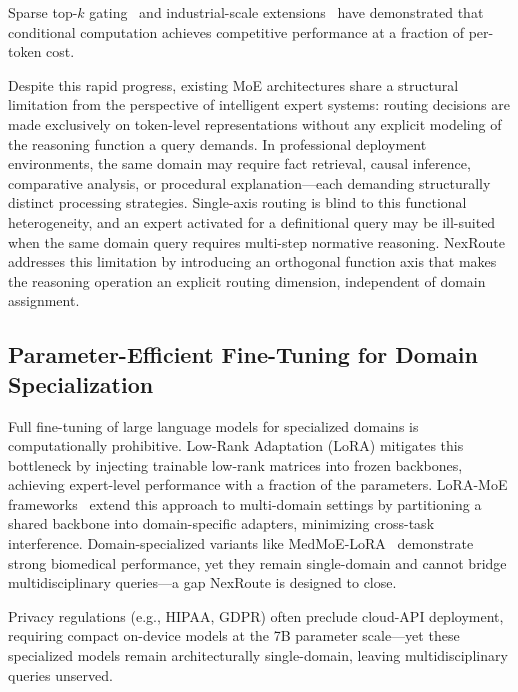 \documentclass[a4paper,fleql]{cas-sc}
\begin{document}
Sparse top-$k$ gating~\citep{fedus2022switch,jiang2024mixtral} and
industrial-scale extensions~\citep{deepseekai2025deepseekv3} have demonstrated
that conditional computation achieves competitive performance at a fraction of
per-token cost.

Despite this rapid progress, existing MoE architectures share a structural
limitation from the perspective of intelligent expert systems: routing decisions
are made exclusively on token-level representations without any explicit
modeling of the reasoning function a query demands. In professional deployment
environments, the same domain may require fact retrieval, causal inference,
comparative analysis, or procedural explanation---each demanding structurally
distinct processing strategies. Single-axis routing is blind to this
functional heterogeneity, and an expert activated for a definitional query
may be ill-suited when the same domain query requires multi-step normative
reasoning. NexRoute addresses this limitation by introducing an orthogonal
function axis that makes the reasoning operation an explicit routing
dimension, independent of domain assignment.

\subsection{Parameter-Efficient Fine-Tuning for Domain Specialization}
Full fine-tuning of large language models for specialized domains is
computationally prohibitive. Low-Rank Adaptation (LoRA) \citep{hu2022lora}
mitigates this bottleneck by injecting trainable low-rank matrices into frozen
backbones, achieving expert-level performance with a fraction of the parameters.
LoRA-MoE frameworks~\citep{dou2024loramoe,wu2024mixtureofloras} extend this
approach to multi-domain settings by partitioning a shared backbone into
domain-specific adapters, minimizing cross-task interference.
Domain-specialized variants like MedMoE-LoRA~\citep{yang2025medmoelora}
demonstrate strong biomedical performance, yet they remain single-domain and
cannot bridge multidisciplinary queries---a gap NexRoute is designed to close.

Privacy regulations (e.g., HIPAA, GDPR) often preclude cloud-API deployment,
requiring compact on-device models at the 7B parameter scale---yet these
specialized models remain architecturally single-domain, leaving multidisciplinary
queries unserved.
\end{document}
